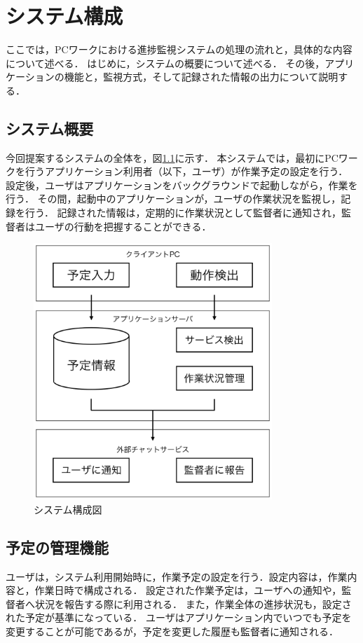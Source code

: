 \chapter{システム構成}

ここでは，PCワークにおける進捗監視システムの処理の流れと，具体的な内容について述べる．
はじめに，システムの概要について述べる．
その後，アプリケーションの機能と，監視方式，そして記録された情報の出力について説明する．

\section{システム概要}
今回提案するシステムの全体を，図\ref{fig:structure_chart}に示す．
本システムでは，最初にPCワークを行うアプリケーション利用者（以下，ユーザ）が作業予定の設定を行う．
設定後，ユーザはアプリケーションをバックグラウンドで起動しながら，作業を行う．
その間，起動中のアプリケーションが，ユーザの作業状況を監視し，記録を行う．
記録された情報は，定期的に作業状況として監督者に通知され，監督者はユーザの行動を把握することができる．

\clearpage

\begin{figure}[h]
  \begin{center}
  \includegraphics[width=9.0cm]{graphics/structure_chart.png}
  \caption{システム構成図}
  \label{fig:structure_chart}
  \end{center}
\end{figure}

\section{予定の管理機能}
ユーザは，システム利用開始時に，作業予定の設定を行う．設定内容は，作業内容と，作業日時で構成される．
設定された作業予定は，ユーザへの通知や，監督者へ状況を報告する際に利用される．
また，作業全体の進捗状況も，設定された予定が基準になっている．
ユーザはアプリケーション内でいつでも予定を変更することが可能であるが，予定を変更した履歴も監督者に通知される．

